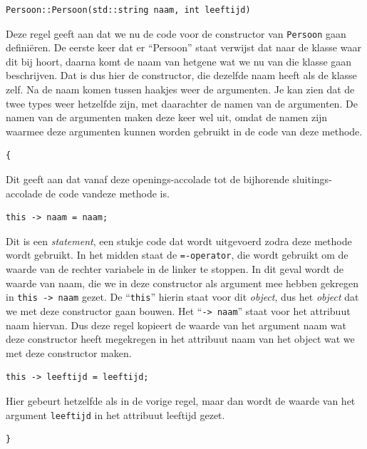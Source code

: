 \documentclass{article}
\begin{document}
\begin{lstlisting}[frame=none]
Persoon::Persoon(std::string naam, int leeftijd)
\end{lstlisting}

Deze regel geeft aan dat we nu de code voor de constructor van \texttt{Persoon} gaan definiëren. De eerste keer dat er “Persoon” staat verwijst dat naar de klasse waar dit bij hoort, daarna komt de naam van hetgene wat we nu van die klasse gaan beschrijven. Dat is dus hier de constructor, die dezelfde naam heeft als de klasse zelf. Na de naam komen tussen haakjes weer de argumenten. Je kan zien dat de twee types weer hetzelfde zijn, met daarachter de namen van de argumenten. De namen van de argumenten maken deze keer wel uit, omdat de namen zijn waarmee deze argumenten kunnen worden gebruikt in de code van deze methode.

\begin{lstlisting}[frame=none]
{
\end{lstlisting}

Dit geeft aan dat vanaf deze openings-accolade tot de bijhorende sluitings-accolade de code vandeze methode is.

\begin{lstlisting}[frame=none]
this -> naam = naam;
\end{lstlisting}

Dit is een \emph{statement}, een stukje code dat wordt uitgevoerd zodra deze methode wordt gebruikt. In het midden staat de \texttt{=-operator}, die wordt gebruikt om de waarde van de rechter variabele in de linker te stoppen. In dit geval wordt de waarde van naam, die we in deze constructor als argument mee hebben gekregen in \texttt{this -> naam} gezet. De “\texttt{this}” hierin staat voor dit \emph{object}, dus het \emph{object} dat we met deze constructor gaan bouwen. Het “\texttt{-> naam}” staat voor het attribuut naam hiervan. Dus deze regel kopieert de waarde van het argument naam wat deze constructor heeft megekregen in het attribuut naam van het object wat we met deze constructor maken.

\begin{lstlisting}[frame=none]
this -> leeftijd = leeftijd;
\end{lstlisting}

Hier gebeurt hetzelfde als in de vorige regel, maar dan wordt de waarde van het argument \texttt{leeftijd} in het attribuut leeftijd gezet.

\begin{lstlisting}[frame=none]
}
\end{lstlisting}
\end{document}
